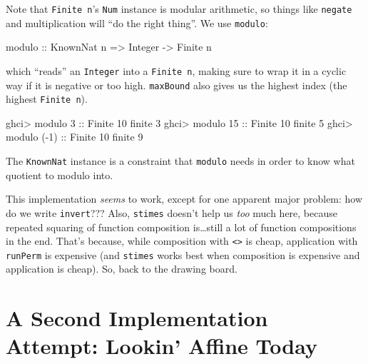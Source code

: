 \documentclass[]{article}
\newenvironment{Shaded}{}{}
\newcommand{\DataTypeTok}[1]{\textcolor[rgb]{0.56,0.13,0.00}{#1}}
\newcommand{\DecValTok}[1]{\textcolor[rgb]{0.25,0.63,0.44}{#1}}
\newcommand{\NormalTok}[1]{#1}
\newcommand{\OperatorTok}[1]{\textcolor[rgb]{0.40,0.40,0.40}{#1}}
\newcommand{\OtherTok}[1]{\textcolor[rgb]{0.00,0.44,0.13}{#1}}
\begin{document}
Note that \texttt{Finite\ n}'s \texttt{Num} instance is modular arithmetic, so
things like \texttt{negate} and multiplication will ``do the right thing''. We
use \texttt{modulo}:

\begin{Shaded}
\begin{Highlighting}[]
\OtherTok{modulo ::} \DataTypeTok{KnownNat}\NormalTok{ n }\OtherTok{=>} \DataTypeTok{Integer} \OtherTok{{-}>} \DataTypeTok{Finite}\NormalTok{ n}
\end{Highlighting}
\end{Shaded}

which ``reads'' an \texttt{Integer} into a \texttt{Finite\ n}, making sure to
wrap it in a cyclic way if it is negative or too high. \texttt{maxBound} also
gives us the highest index (the highest \texttt{Finite\ n}).

\begin{Shaded}
\begin{Highlighting}[]
\NormalTok{ghci}\OperatorTok{>}\NormalTok{ modulo }\DecValTok{3}\OtherTok{ ::} \DataTypeTok{Finite} \DecValTok{10}
\NormalTok{finite }\DecValTok{3}
\NormalTok{ghci}\OperatorTok{>}\NormalTok{ modulo }\DecValTok{15}\OtherTok{ ::} \DataTypeTok{Finite} \DecValTok{10}
\NormalTok{finite }\DecValTok{5}
\NormalTok{ghci}\OperatorTok{>}\NormalTok{ modulo (}\OperatorTok{{-}}\DecValTok{1}\NormalTok{)}\OtherTok{ ::} \DataTypeTok{Finite} \DecValTok{10}
\NormalTok{finite }\DecValTok{9}
\end{Highlighting}
\end{Shaded}

The \texttt{KnownNat} instance is a constraint that \texttt{modulo} needs in
order to know what quotient to modulo into.

This implementation \emph{seems} to work, except for one apparent major problem:
how do we write \texttt{invert}??? Also, \texttt{stimes} doesn't help us
\emph{too} much here, because repeated squaring of function composition
is\ldots still a lot of function compositions in the end. That's because, while
composition with \texttt{\textless{}\textgreater{}} is cheap, application with
\texttt{runPerm} is expensive (and \texttt{stimes} works best when composition
is expensive and application is cheap). So, back to the drawing board.

\hypertarget{a-second-implementation-attempt-lookin-affine-today}{%
\section{A Second Implementation Attempt: Lookin' Affine
Today}\label{a-second-implementation-attempt-lookin-affine-today}}
\end{document}
